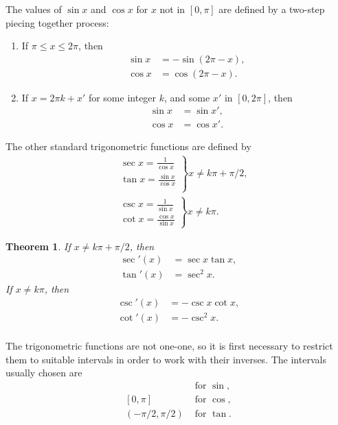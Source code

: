 \documentclass{article}
\newtheorem{theorem}{Theorem}
\begin{document}
The values of $\sin x$ and $\cos x$ for $x$ not in $[0, \pi]$ are defined by a
two-step piecing together process:
\begin{enumerate}
  \item If $\pi \leq x \leq 2\pi$, then
    \begin{align*}
      \sin x &= -\sin(2\pi - x), \\
      \cos x &= \cos(2\pi - x).
    \end{align*}
  \item If $x = 2\pi k + x'$ for some integer $k$, and some $x'$ in $[0,
    2\pi]$, then
    \begin{align*}
      \sin x &= \sin x', \\
      \cos x &= \cos x'.
    \end{align*}
\end{enumerate}

The other standard trigonometric functions are defined by
\begin{align*}
  &\left.
    \begin{array}{c}
      \sec x = \frac{1}{\cos x} \\
      \tan x = \frac{\sin x}{\cos x} \\
    \end{array}
  \right\} x \neq k\pi + \pi/2, \\
  &\left.
    \begin{array}{c}
      \csc x = \frac{1}{\sin x} \\
      \cot x = \frac{\cos x}{\sin x}
    \end{array}
  \right\} x \neq k\pi.
\end{align*}

\begin{theorem}
  If $x \neq k\pi + \pi/2$, then
  \begin{align*}
    \sec'(x) &= \sec x \tan x, \\
    \tan'(x) &= \sec^2 x.
  \end{align*}
  If $x \neq k\pi$, then
  \begin{align*}
    \csc'(x) &= -\csc x \cot x, \\
    \cot'(x) &= -\csc^2 x. \\
  \end{align*}
\end{theorem}

The trigonometric functions are not one-one, so it is first necessary to
restrict them to suitable intervals in order to work with their inverses. The
intervals usually chosen are
\begin{align*}
  [-\pi/2, \pi/2] &\text{ for } \sin, \\
  [0, \pi]        &\text{ for } \cos, \\
  (-\pi/2, \pi/2) &\text{ for } \tan.
\end{align*}
\end{document}
